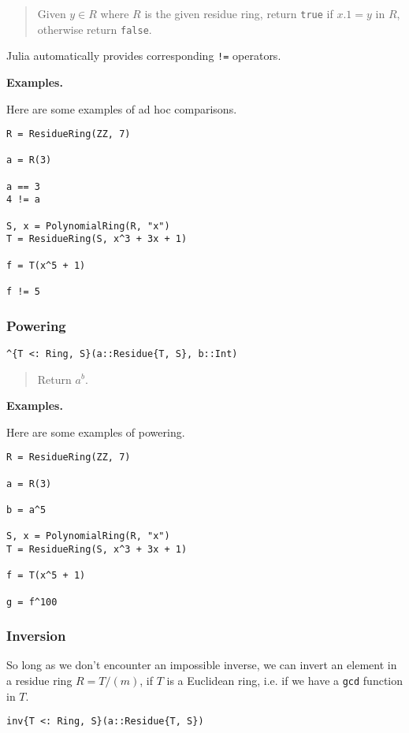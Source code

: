 \documentclass[a4paper,10pt]{article}
\newcommand{\code}{\lstinline}
\newcommand{\desc}[1]{\vspace{-3mm}\begin{quote}#1\end{quote}}
\begin{document}
{{{\desc{Given $y \in R$ where $R$ is the given residue ring, return \code{true} 
if $x.1 = y$ in $R$, otherwise return \code{false}.}

Julia automatically provides corresponding \code{!=} operators.

\textbf{Examples.}

Here are some examples of ad hoc comparisons.

\begin{lstlisting}
R = ResidueRing(ZZ, 7)

a = R(3)

a == 3
4 != a

S, x = PolynomialRing(R, "x")
T = ResidueRing(S, x^3 + 3x + 1)

f = T(x^5 + 1)

f != 5
\end{lstlisting}

\subsubsection{Powering}

\begin{lstlisting}
^{T <: Ring, S}(a::Residue{T, S}, b::Int)
\end{lstlisting}

\desc{Return $a^b$.}

\textbf{Examples.}

Here are some examples of powering.

\begin{lstlisting}
R = ResidueRing(ZZ, 7)

a = R(3)

b = a^5

S, x = PolynomialRing(R, "x")
T = ResidueRing(S, x^3 + 3x + 1)

f = T(x^5 + 1)

g = f^100
\end{lstlisting}

\subsubsection{Inversion}

So long as we don't encounter an impossible inverse, we can
invert an element in a residue ring $R = T/(m)$, if $T$ is a
Euclidean ring, i.e. if we have a \code{gcd} function in $T$.

\begin{lstlisting}
inv{T <: Ring, S}(a::Residue{T, S})
\end{lstlisting}

}}}
\end{document}
